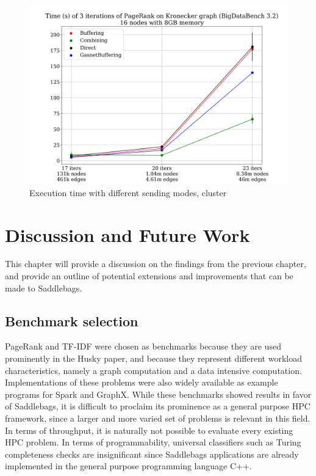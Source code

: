 \documentclass{uit-report}
\begin{document}
\begin{figure}[H]
	\centering
	\includegraphics[width=15cm]{illustrations/png/sendingmodescluster.png}
	\caption{Execution time with different sending modes, cluster}
	\label{fig:sendingmodesabel}
\end{figure}


\newpage
\mbox{} \pagebreak
\newpage
\chapter{Discussion and Future Work} \label{section:discussion}
This chapter will provide a discussion on the findings from the previous chapter, and provide an outline of potential extensions and improvements that can be made to Saddlebags.

\section{Benchmark selection}
PageRank and TF-IDF were chosen as benchmarks because they are used prominently in the Husky paper, and because they represent different workload characteristics, namely a graph computation and a data intensive computation. Implementations of these problems were also widely available as example programs for Spark and GraphX. While these benchmarks showed results in favor of Saddlebags, it is difficult to proclaim its prominence as a general purpose HPC framework, since a larger and more varied set of problems is relevant in this field. In terms of throughput, it is naturally not possible to evaluate every existing HPC problem. In terms of programmability, universal classifiers such as Turing completeness checks are insignificant since Saddlebags applications are already implemented in the general purpose programming language C++. 
\end{document}
